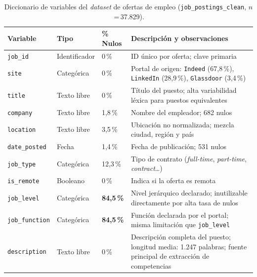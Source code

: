 \begin{table}[H]
  \caption{Diccionario de variables del \textit{dataset} de ofertas de empleo (\texttt{job\_postings\_clean}, $n$\,=\,37.829).}
  \label{tab:vars_ofertas}
  \centering
  \footnotesize
  \begin{tabular}{|p{3.2cm}|p{2.2cm}|p{1.5cm}|p{7.2cm}|}
    \hline
    \rowcolor{gray!15}
    \textbf{Variable} & \textbf{Tipo} & \textbf{\% Nulos} & \textbf{Descripción y observaciones} \\
    \hline
    \texttt{job\_id}       & Identificador & 0\,\%    & ID único por oferta; clave primaria \\
    \hline
    \texttt{site}          & Categórica    & 0\,\%    & Portal de origen: \texttt{Indeed} (67,8\,\%), \texttt{LinkedIn} (28,9\,\%), \texttt{Glassdoor} (3,4\,\%) \\
    \hline
    \texttt{title}         & Texto libre   & 0\,\%    & Título del puesto; alta variabilidad léxica para puestos equivalentes \\
    \hline
    \texttt{company}       & Texto libre   & 1,8\,\%  & Nombre del empleador; 682 nulos \\
    \hline
    \texttt{location}      & Texto libre   & 3,5\,\%  & Ubicación no normalizada; mezcla ciudad, región y país \\
    \hline
    \texttt{date\_posted}  & Fecha         & 1,4\,\%  & Fecha de publicación; 531 nulos \\
    \hline
    \texttt{job\_type}     & Categórica    & 12,3\,\% & Tipo de contrato (\textit{full-time}, \textit{part-time}, \textit{contract}\ldots) \\
    \hline
    \texttt{is\_remote}    & Booleano      & 0\,\%    & Indica si la oferta es remota \\
    \hline
    \texttt{job\_level}    & Categórica    & \textbf{84,5\,\%} & Nivel jerárquico declarado; inutilizable directamente por alta tasa de nulos \\
    \hline
    \texttt{job\_function} & Categórica    & \textbf{84,5\,\%} & Función declarada por el portal; misma limitación que \texttt{job\_level} \\
    \hline
    \texttt{description}   & Texto libre   & 0\,\%    & Descripción completa del puesto; longitud media: 1.247 palabras; fuente principal de extracción de competencias \\
    \hline
  \end{tabular}
\end{table}

